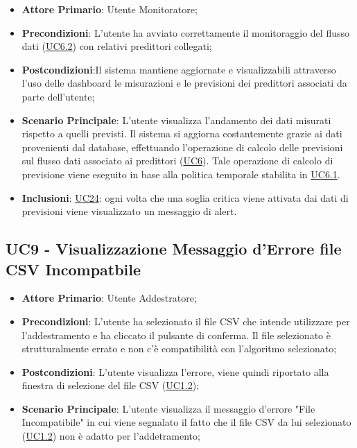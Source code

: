 		\begin{itemize}
			\item\textbf{Attore Primario}: Utente Monitoratore;
			\item\textbf{Precondizioni}: L’utente ha avviato correttamente il monitoraggio del flusso dati (\hyperref[par:UC6.2]{UC6.2}) con relativi predittori collegati;
			\item\textbf{Postcondizioni}:Il sistema mantiene aggiornate e visualizzabili attraverso l’uso delle dashboard le misurazioni e le previsioni dei predittori associati da parte dell’utente; 
			\item\textbf{Scenario Principale}: L’utente visualizza l’andamento dei dati misurati rispetto a quelli previsti. Il sistema si aggiorna costantemente grazie ai dati provenienti dal database, effettuando l’operazione di calcolo delle previsioni sul flusso dati associato ai predittori (\hyperref[par:UC6]{UC6}). Tale operazione di calcolo di previsione viene eseguito in base alla politica temporale stabilita in \hyperref[par:UC6.1]{UC6.1}.		
			\item\textbf{Inclusioni}: \hyperref[par:UC24]{UC24}: ogni volta che una soglia critica viene attivata dai dati di previsioni viene visualizzato un messaggio di alert. 
		\end{itemize}

	
	\label{par:UC9}
	\subsection{UC9 - Visualizzazione Messaggio d'Errore file CSV Incompatbile}
		\begin{itemize}
			\item\textbf{Attore Primario}: Utente Addestratore;
			\item\textbf{Precondizioni}: L’utente ha selezionato il file CSV che intende utilizzare per l'addestramento e ha cliccato il pulsante di conferma. Il file selezionato è strutturalmente errato e non c'è compatibilità con l'algoritmo selezionato;
			\item\textbf{Postcondizioni}: L'utente visualizza l'errore, viene quindi riportato alla finestra di selezione del file CSV (\hyperref[par:UC1.2]{UC1.2});
			\item\textbf{Scenario Principale}: L’utente visualizza il messaggio d'errore "File Incompatibile" in cui viene segnalato il fatto che il file CSV da lui selezionato (\hyperref[par:UC1.2]{UC1.2}) non è adatto per l'addetramento;  		
		\end{itemize}

